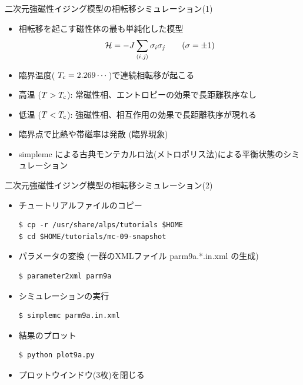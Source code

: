 \begin{frame}[t,fragile]{二次元強磁性イジング模型の相転移シミュレーション(1)}
  \begin{itemize}
  \item 相転移を起こす磁性体の最も単純化した模型
    \[
      {\cal H} = - J \sum_{\langle i,j \rangle} \sigma_i \sigma_j \qquad (\sigma = \pm 1)
      \]
    \item 臨界温度( $T_{\rm c}=2.269\cdots$)で連続相転移が起こる
    \item 高温 ($T > T_{\rm c}$): 常磁性相、エントロピーの効果で長距離秩序なし
    \item 低温 ($T < T_{\rm c}$): 強磁性相、相互作用の効果で長距離秩序が現れる
    \item 臨界点で比熱や帯磁率は発散 (臨界現象)
    \item simplemc による古典モンテカルロ法(メトロポリス法)による平衡状態のシミュレーション
  \end{itemize}
\end{frame}

\begin{frame}[t,fragile]{二次元強磁性イジング模型の相転移シミュレーション(2)}
  \begin{itemize}
  \item チュートリアルファイルのコピー
\begin{lstlisting}
$ cp -r /usr/share/alps/tutorials $HOME
$ cd $HOME/tutorials/mc-09-snapshot
\end{lstlisting}
  \item パラメータの変換 (一群のXMLファイル parm9a.*.in.xml の生成)
\begin{lstlisting}
$ parameter2xml parm9a
\end{lstlisting}
  \item シミュレーションの実行
\begin{lstlisting}
$ simplemc parm9a.in.xml
\end{lstlisting}
\item 結果のプロット
\begin{lstlisting}
$ python plot9a.py
\end{lstlisting}
\item プロットウインドウ(3枚)を閉じる
  \end{itemize}
\end{frame}

